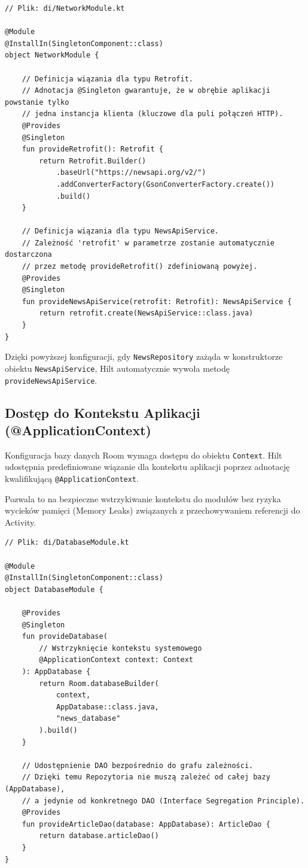 \begin{verbatim}
// Plik: di/NetworkModule.kt

@Module
@InstallIn(SingletonComponent::class) 
object NetworkModule {

    // Definicja wiązania dla typu Retrofit.
    // Adnotacja @Singleton gwarantuje, że w obrębie aplikacji powstanie tylko
    // jedna instancja klienta (kluczowe dla puli połączeń HTTP).
    @Provides
    @Singleton 
    fun provideRetrofit(): Retrofit {
        return Retrofit.Builder()
            .baseUrl("https://newsapi.org/v2/")
            .addConverterFactory(GsonConverterFactory.create())
            .build()
    }

    // Definicja wiązania dla typu NewsApiService.
    // Zależność 'retrofit' w parametrze zostanie automatycznie dostarczona
    // przez metodę provideRetrofit() zdefiniowaną powyżej.
    @Provides
    @Singleton
    fun provideNewsApiService(retrofit: Retrofit): NewsApiService {
        return retrofit.create(NewsApiService::class.java)
    }
}
\end{verbatim}

Dzięki powyższej konfiguracji, gdy \texttt{NewsRepository} zażąda w konstruktorze obiektu \texttt{NewsApiService}, Hilt automatycznie wywoła metodę \texttt{provideNewsApiService}.

\subsection{Dostęp do Kontekstu Aplikacji (@ApplicationContext)}

Konfiguracja bazy danych Room wymaga dostępu do obiektu \texttt{Context}. Hilt udostępnia predefiniowane wiązanie dla kontekstu aplikacji poprzez adnotację kwalifikującą \texttt{@ApplicationContext}.

Pozwala to na bezpieczne wstrzykiwanie kontekstu do modułów bez ryzyka wycieków pamięci (Memory Leaks) związanych z przechowywaniem referencji do Activity.

\begin{verbatim}
// Plik: di/DatabaseModule.kt

@Module
@InstallIn(SingletonComponent::class)
object DatabaseModule {

    @Provides
    @Singleton
    fun provideDatabase(
        // Wstrzyknięcie kontekstu systemowego
        @ApplicationContext context: Context
    ): AppDatabase {
        return Room.databaseBuilder(
            context,
            AppDatabase::class.java,
            "news_database"
        ).build()
    }

    // Udostępnienie DAO bezpośrednio do grafu zależności.
    // Dzięki temu Repozytoria nie muszą zależeć od całej bazy (AppDatabase),
    // a jedynie od konkretnego DAO (Interface Segregation Principle).
    @Provides
    fun provideArticleDao(database: AppDatabase): ArticleDao {
        return database.articleDao()
    }
}
\end{verbatim}

